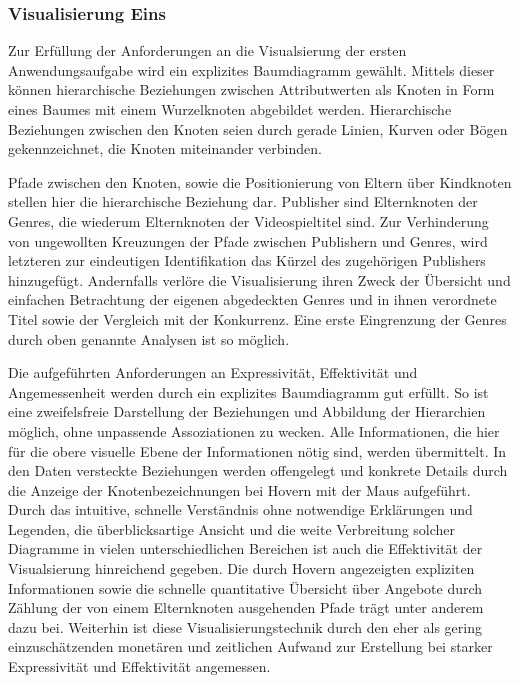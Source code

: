 \documentclass[usegeometry=true]{scrartcl}
\begin{document}
\subsubsection{Visualisierung Eins}
Zur Erfüllung der Anforderungen an die Visualsierung der ersten Anwendungsaufgabe wird ein explizites Baumdiagramm gewählt.
Mittels dieser können hierarchische Beziehungen zwischen Attributwerten als Knoten in Form eines Baumes mit einem Wurzelknoten abgebildet werden. 
Hierarchische Beziehungen zwischen den Knoten seien durch gerade Linien, Kurven oder Bögen gekennzeichnet, die Knoten miteinander verbinden.\cite[1]{Schulz.2011} 

Pfade zwischen den Knoten, sowie die Positionierung von Eltern über Kindknoten stellen hier die hierarchische Beziehung dar. 
Publisher sind Elternknoten der Genres, die wiederum Elternknoten der Videospieltitel sind.
Zur Verhinderung von ungewollten Kreuzungen der Pfade zwischen Publishern und Genres, wird letzteren zur eindeutigen Identifikation das Kürzel des zugehörigen Publishers hinzugefügt.
Andernfalls verlöre die Visualisierung ihren Zweck der Übersicht und einfachen Betrachtung der eigenen abgedeckten Genres und in ihnen verordnete Titel sowie der Vergleich mit der Konkurrenz.
Eine erste Eingrenzung der Genres durch oben genannte Analysen ist so möglich.

Die aufgeführten Anforderungen an Expressivität, Effektivität und Angemessenheit werden durch ein explizites Baumdiagramm gut erfüllt.
So ist eine zweifelsfreie Darstellung der Beziehungen und Abbildung der Hierarchien möglich, ohne unpassende Assoziationen zu wecken. 
Alle Informationen, die hier für die obere visuelle Ebene der Informationen nötig sind, werden übermittelt. 
In den Daten versteckte Beziehungen werden offengelegt und konkrete Details durch die Anzeige der Knotenbezeichnungen bei Hovern mit der Maus aufgeführt.
Durch das intuitive, schnelle Verständnis ohne notwendige Erklärungen und Legenden, die überblicksartige Ansicht und die weite Verbreitung solcher Diagramme in vielen unterschiedlichen Bereichen ist auch die Effektivität der Visualsierung hinreichend gegeben. 
Die durch Hovern angezeigten expliziten Informationen sowie die schnelle quantitative Übersicht über Angebote durch Zählung der von einem Elternknoten ausgehenden Pfade trägt unter anderem dazu bei.
Weiterhin ist diese Visualisierungstechnik durch den eher als gering einzuschätzenden monetären und zeitlichen Aufwand zur Erstellung bei starker Expressivität und Effektivität angemessen.
\end{document}

